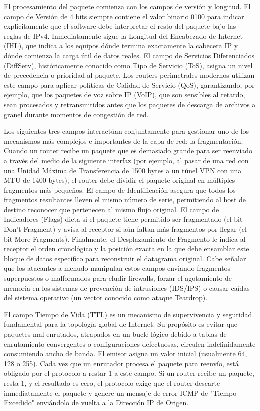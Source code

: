 \documentclass[a4paper,12pt]{article}
\begin{document}
El procesamiento del paquete comienza con los campos de versión y longitud. El campo de Versión de 4 bits siempre contiene el valor binario 0100 para indicar explícitamente que el software debe interpretar el resto del paquete bajo las reglas de IPv4. Inmediatamente sigue la Longitud del Encabezado de Internet (IHL), que indica a los equipos dónde termina exactamente la cabecera IP y dónde comienza la carga útil de datos reales. El campo de Servicios Diferenciados (DiffServ), históricamente conocido como Tipo de Servicio (ToS), asigna un nivel de precedencia o prioridad al paquete. Los routers perimetrales modernos utilizan este campo para aplicar políticas de Calidad de Servicio (QoS), garantizando, por ejemplo, que los paquetes de voz sobre IP (VoIP), que son sensibles al retardo, sean procesados y retransmitidos antes que los paquetes de descarga de archivos a granel durante momentos de congestión de red.

Los siguientes tres campos interactúan conjuntamente para gestionar uno de los mecanismos más complejos e importantes de la capa de red: la fragmentación. Cuando un router recibe un paquete que es demasiado grande para ser reenviado a través del medio de la siguiente interfaz (por ejemplo, al pasar de una red con una Unidad Máxima de Transferencia de 1500 bytes a un túnel VPN con una MTU de 1400 bytes), el router debe dividir el paquete original en múltiples fragmentos más pequeños. El campo de Identificación asegura que todos los fragmentos resultantes lleven el mismo número de serie, permitiendo al host de destino reconocer que pertenecen al mismo flujo original. El campo de Indicadores (Flags) dicta si el paquete tiene permitido ser fragmentado (el bit Don't Fragment) y avisa al receptor si aún faltan más fragmentos por llegar (el bit More Fragments). Finalmente, el Desplazamiento de Fragmento le indica al receptor el orden cronológico y la posición exacta en la que debe ensamblar este bloque de datos específico para reconstruir el datagrama original. Cabe señalar que los atacantes a menudo manipulan estos campos enviando fragmentos superpuestos o malformados para eludir firewalls, forzar el agotamiento de memoria en los sistemas de prevención de intrusiones (IDS/IPS) o causar caídas del sistema operativo (un vector conocido como ataque Teardrop).

El campo Tiempo de Vida (TTL) es un mecanismo de supervivencia y seguridad fundamental para la topología global de Internet. Su propósito es evitar que paquetes mal enrutados, atrapados en un bucle lógico debido a tablas de enrutamiento convergentes o configuraciones defectuosas, circulen indefinidamente consumiendo ancho de banda. El emisor asigna un valor inicial (usualmente 64, 128 o 255). Cada vez que un enrutador procesa el paquete para reenvío, está obligado por el protocolo a restar 1 a este campo. Si un router recibe un paquete, resta 1, y el resultado es cero, el protocolo exige que el router descarte inmediatamente el paquete y genere un mensaje de error ICMP de "Tiempo Excedido" enviándolo de vuelta a la Dirección IP de Origen.
\end{document}
